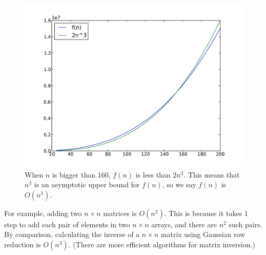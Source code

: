 \begin{figure}
\centering
\includegraphics[width=\textwidth]{asymp_upper_bound.pdf}
\caption{When $n$ is bigger than 160, $f(n)$ is less than $2n^3$. This means that $n^3$ is an asymptotic upper bound for $f(n)$, so we say $f(n)$ is $O(n^3)$.}
\label{fig:asymp_upper_bound}
\end{figure}

For example, adding two $n \times n$ matrices is $O(n^2)$. 
This is because it takes 1 step to add each pair of elements in two $n \times n$ arrays, and there are $n^2$ such pairs.
By comparison, calculating the inverse of a $n \times n$ matrix using Gaussian row reduction is $O(n^3)$. 
(There are more efficient algorithms for matrix inversion.)

